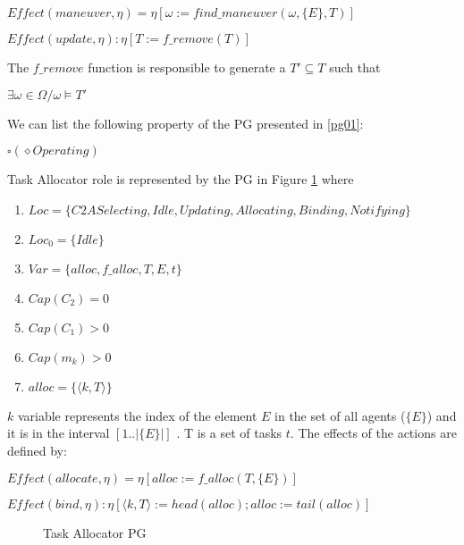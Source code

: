    \qquad $Effect(maneuver, \eta)= \eta[\omega:= find\_maneuver(\omega, \{E\}, T)]$
    
    \qquad $Effect(update, \eta): \eta[T:=f\_remove(T)]$
    


The $f\_remove$ function is responsible to generate a $T' \subseteq T$ such that 

\begin{center}
$ \exists \omega \in \Omega / \omega \models T' $
\end{center}

We can list the following property of the PG presented in \ref{pg01}:

\begin{center}
$ \square (\diamond Operating) $
\end{center}

Task Allocator role is represented by the PG in Figure \ref{ta} where

\begin{enumerate}

    \item $Loc=\{C2A Selecting, Idle, Updating, Allocating, Binding, Notifying \}$
    
    \item $Loc_0=\{Idle\}$
    
    \item $Var=\{alloc, f\_alloc, T, E, t\} $
    
    \item $Cap(C_2)=0 $
    
    \item $Cap(C_1)>0 $
    
    \item $Cap(m_k)>0 $
    
    \item $alloc=\{\langle k,T \rangle\}  $
\end{enumerate}

$k$ variable represents the index of the element $E$ in the set of all agents ($\{E\}$) and it is in the interval $[1..|\{E\}|]$ . T is a set of tasks $t$. The effects of the actions are defined by:

\qquad $Effect(allocate, \eta)= \eta[alloc:= f\_alloc(T, \{E\})]$
    
\qquad $Effect(bind, \eta): \eta[\langle k,T \rangle:=head(alloc); alloc:=tail(alloc)]$

\begin{figure}[h]
\centering

\label{ta}
\caption{Task Allocator PG}
\end{figure}


